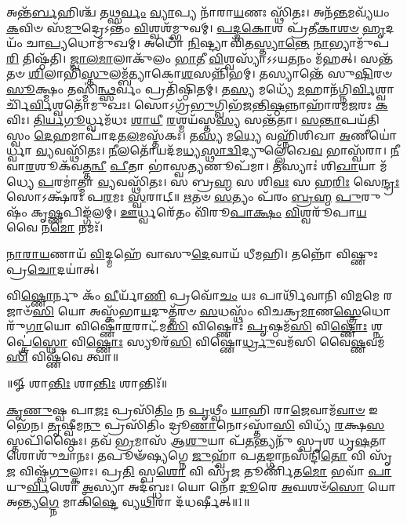 𑌅𑌨𑍍𑌤᳴\-\ul{𑌰𑍍𑌬}\-𑌹𑌿𑌶𑍍𑌚᳴ 𑌤\-\ul{𑌥𑍍𑌸}\-\-\ul{𑌰𑍍𑌵𑌂} \ul{𑌵𑍍𑌯𑌾}\-𑌪𑍍𑌯 𑌨𑌾᳴𑌰𑌾\-\ul{𑌯}\-𑌣𑌃 𑌸𑍍𑌥𑌿᳴𑌤𑌃। 𑌅𑌨᳴\-\ul{𑌨𑍍𑌤}\-𑌮𑌵𑍍𑌯᳴𑌯𑌂 \ul{𑌕}\-𑌵𑌿𑍞 𑌸᳴\-\ul{𑌮𑍁}\-𑌦𑍍𑌰𑍇𑌽𑌨𑍍𑌤𑌂᳴  \ul{𑌵𑌿}\-𑌶𑍍𑌵𑌶᳴𑌮𑍍𑌭𑍁𑌵𑌮𑍍। \ul{𑌪}\-\-\ul{𑌦𑍍𑌮}\-\-\ul{𑌕𑍋}\-𑌶 𑌪𑍍𑌰᳴𑌤𑍀\-\ul{𑌕𑌾}\-\-\ul{𑌶}\-\-\ul{𑍞} \ul{𑌹𑍃}\-𑌦𑌯𑌂᳴ 𑌚𑌾\-\ul{𑌪𑍍𑌯}\-𑌧𑍋𑌮𑍁᳴𑌖𑌮𑍍। 𑌅𑌧𑍋᳴ \ul{𑌨𑌿}\-𑌷𑍍𑌟𑍍𑌯𑌾 𑌵𑌿᳴𑌤\-\ul{𑌸𑍍𑌤𑍍𑌯𑌾}\-\-\ul{𑌨𑍍𑌤𑍇} \ul{𑌨𑌾}\-𑌭𑍍𑌯𑌾𑌮𑍁᳴𑌪\-\ul{𑌰𑌿} 𑌤𑌿𑌷𑍍𑌠᳴𑌤𑌿। \ul{𑌜𑍍𑌵𑌾}\-\-\ul{𑌲}\-\-\ul{𑌮𑌾}\-𑌲𑌾𑌕𑍁᳴𑌲𑌂 \ul{𑌭𑌾}\-\-\ul{𑌤𑍀} \ul{𑌵𑌿}\-𑌶𑍍𑌵𑌸𑍍𑌯𑌾᳴𑌽𑌽𑌯\-\ul{𑌤}\-𑌨𑌂 𑌮᳴𑌹𑌤𑍍। 𑌸𑌨𑍍𑌤᳴𑌤𑍞 \ul{𑌶𑌿}\-𑌲𑌾𑌭𑌿᳴\-\ul{𑌸𑍍𑌤𑍁}\-\-𑌲𑌮𑍍𑌬᳴𑌤𑍍𑌯𑌾𑌕𑍋\-\ul{𑌶}\-𑌸𑌨𑍍𑌨𑌿᳴𑌭𑌮𑍍। 𑌤𑌸𑍍𑌯𑌾𑌨𑍍𑌤𑍇᳴ 𑌸𑍁\-\ul{𑌷𑌿}\-𑌰𑍞 \ul{𑌸𑍂}\-𑌕𑍍𑌷𑍍𑌮𑌂 𑌤𑌸𑍍𑌮𑌿॑\-\ul{𑌨𑍍𑌥𑍍𑌸}\-𑌰𑍍𑌵𑌂 𑌪𑍍𑌰𑌤𑌿᳴𑌷𑍍𑌠𑌿𑌤𑌮𑍍। 𑌤\-\ul{𑌸𑍍𑌯} 𑌮𑌧𑍍𑌯𑍇᳴ \ul{𑌮}\-𑌹𑌾𑌨᳴\-𑌗𑍍𑌨𑌿\-\ul{𑌰𑍍𑌵𑌿}\-𑌶𑍍𑌵𑌾𑌰𑍍𑌚𑌿᳴\-\ul{𑌰𑍍𑌵𑌿}\-𑌶𑍍𑌵𑌤𑍋᳴𑌮𑍁𑌖𑌃। 𑌸𑍋𑌽𑌗𑍍𑌰᳴\-\ul{𑌭𑍁}\-𑌗𑍍𑌵𑌿𑌭᳴𑌜\-\ul{𑌨𑍍𑌤𑌿}\-\-\ul{𑌷𑍍𑌠}\-𑌨𑍍𑌨𑌾𑌹𑌾᳴𑌰𑌮\-\ul{𑌜}\-𑌰𑌃 \ul{𑌕}\-𑌵𑌿𑌃। \ul{𑌤𑌿}\-\-\ul{𑌰𑍍𑌯}\-\-\ul{𑌗𑍂}\-𑌰𑍍𑌧𑍍𑌵𑌮᳴𑌧𑌃 \ul{𑌶𑌾}\-\-\ul{𑌯𑍀} \ul{𑌰}\-𑌶𑍍𑌮𑌯᳴𑌸𑍍𑌤\-\ul{𑌸𑍍𑌯} 𑌸𑌨𑍍𑌤᳴𑌤𑌾। \ul{𑌸}\-\-\ul{𑌨𑍍𑌤𑌾}\-𑌪𑌯᳴𑌤𑌿 𑌸𑍍𑌵𑌂 \ul{𑌦𑍇}\-𑌹𑌮𑌾𑌪𑌾᳴𑌦𑌤\-\ul{𑌲}\-𑌮𑌸𑍍𑌤᳴𑌕𑌃। 𑌤\-\ul{𑌸𑍍𑌯} 𑌮\-\ul{𑌧𑍍𑌯𑍇} 𑌵𑌹𑍍𑌨𑌿᳴𑌶𑌿𑌖𑌾 \ul{𑌅}\-𑌣𑍀𑌯𑍋॑𑌰𑍍𑌧𑍍𑌵𑌾 \ul{𑌵𑍍𑌯}\-𑌵𑌸𑍍𑌥𑌿᳴𑌤𑌃। \ul{𑌨𑍀}\-𑌲𑌤𑍋᳴𑌯𑌦᳴\-𑌮\-\ul{𑌧𑍍𑌯}\-\-\ul{𑌸𑍍𑌥𑌾}\-\-\ul{𑌦𑍍𑌵𑌿}\-𑌦𑍍𑌯𑍁𑌲𑍍𑌲𑍇᳴𑌖𑍇\-\ul{𑌵}  𑌭𑌾𑌸𑍍𑌵᳴𑌰𑌾। \ul{𑌨𑍀}\-𑌵𑌾\-\ul{𑌰}\-𑌶𑍂𑌕᳴𑌵\-\ul{𑌤𑍍𑌤}\-\-\ul{𑌨𑍍𑌵𑍀} \ul{𑌪𑍀}\-𑌤𑌾 𑌭𑌾॑𑌸𑍍𑌵\-\ul{𑌤𑍍𑌯}\-𑌣𑍂𑌪᳴𑌮𑌾। 𑌤𑌸𑍍𑌯𑌾𑌃॑ 𑌶𑌿\-\ul{𑌖𑌾}\-𑌯𑌾 𑌮᳴𑌧𑍍𑌯𑍇 \ul{𑌪}\-𑌰𑌮𑌾॑𑌤𑍍𑌮𑌾 \ul{𑌵𑍍𑌯}\-𑌵𑌸𑍍𑌥𑌿᳴𑌤𑌃। 𑌸 𑌬𑍍𑌰\-\ul{𑌹𑍍𑌮} 𑌸 𑌶𑌿\-\ul{𑌵𑌃} 𑌸 𑌹\-\ul{𑌰𑌿𑌃} 𑌸𑍇\-\ul{𑌨𑍍𑌦𑍍𑌰𑌃} 𑌸𑍋𑌽𑌕𑍍𑌷᳴𑌰𑌃 𑌪\-\ul{𑌰}\-𑌮𑌃 \ul{𑌸𑍍𑌵}\-𑌰𑌾𑌟𑍍॥ 
\-\ul{𑌋}\-𑌤𑍞 \ul{𑌸}\-𑌤𑍍𑌯𑌂 𑌪᳴𑌰𑌂 \ul{𑌬𑍍𑌰}\-\-\ul{𑌹𑍍𑌮} \ul{𑌪𑍁}\-𑌰𑍁𑌷𑌂᳴ 𑌕𑍃\-\ul{𑌷𑍍𑌣}\-𑌪𑌿𑌙𑍍𑌗᳴𑌲𑌮𑍍। \ul{𑌊}\-𑌰𑍍𑌧𑍍𑌵𑌰𑍇᳴𑌤𑌂 𑌵𑌿᳴𑌰𑍂\-\ul{𑌪𑌾}\-\-\ul{𑌕𑍍𑌷𑌂} \ul{𑌵𑌿}\-𑌶𑍍𑌵𑌰𑍂᳴𑌪𑌾\-\ul{𑌯} 𑌵𑍈 𑌨\-\ul{𑌮𑍋} 𑌨𑌮𑌃᳴। 

\-\ul{𑌨𑌾}\-\-\ul{𑌰𑌾}\-\-\ul{𑌯}\-𑌣𑌾𑌯᳴ \ul{𑌵𑌿}\-𑌦𑍍𑌮𑌹𑍇᳴ 𑌵𑌾𑌸𑍁\-\ul{𑌦𑍇}\-𑌵𑌾𑌯᳴ 𑌧𑍀𑌮𑌹𑌿। 𑌤𑌨𑍍𑌨𑍋᳴ 𑌵𑌿𑌷𑍍𑌣𑍁𑌃 𑌪𑍍𑌰\-\ul{𑌚𑍋}\-𑌦𑌯𑌾॑𑌤𑍍। 

𑌵𑌿\-\ul{𑌷𑍍𑌣𑍋}\-𑌰𑍍𑌨𑍁 𑌕𑌂᳴ \ul{𑌵𑍀}\-𑌰𑍍𑌯𑌾᳴\-\ul{𑌣𑌿} 𑌪𑍍𑌰𑌵𑍋᳴\-\ul{𑌚𑌂} 𑌯𑌃 𑌪𑌾𑌰𑍍𑌥𑌿᳴𑌵𑌾𑌨𑌿 𑌵𑌿\-\ul{𑌮}\-𑌮𑍇 𑌰𑌜𑌾𑍞᳴\-\ul{𑌸𑌿} 𑌯𑍋 𑌅𑌸𑍍𑌕᳴𑌭𑌾\-\ul{𑌯}\-𑌦𑍁𑌤𑍍𑌤᳴𑌰𑍞 \ul{𑌸}\-𑌧𑌸𑍍𑌥𑌂᳴ 𑌵𑌿𑌚𑌕𑍍𑌰\-\ul{𑌮𑌾}\-𑌣\-\ul{𑌸𑍍𑌤𑍍𑌰𑍇}\-𑌧𑍋𑌰𑍁᳴\-\ul{𑌗𑌾}\-𑌯𑍋 𑌵𑌿𑌷𑍍𑌣𑍋᳴\-\ul{𑌰}\-𑌰𑌾𑌟᳴𑌮\-\ul{𑌸𑌿} 𑌵𑌿𑌷𑍍𑌣𑍋𑌃॑ \ul{𑌪𑍃}\-𑌷𑍍𑌠𑌮᳴\-\ul{𑌸𑌿} 𑌵𑌿\-\ul{𑌷𑍍𑌣𑍋𑌃} 𑌶𑍍𑌨𑌪𑍍𑌤𑍍𑌰𑍇॑\-\ul{𑌸𑍍𑌥𑍋} 𑌵𑌿\-\ul{𑌷𑍍𑌣𑍋𑌃} 𑌸𑍍𑌯𑍂𑌰᳴\-\ul{𑌸𑌿} 𑌵𑌿𑌷𑍍𑌣𑍋॑\-\ul{𑌰𑍍𑌧𑍍𑌰𑍁}\-𑌵𑌮᳴𑌸𑌿 𑌵𑍈\-\ul{𑌷𑍍𑌣}\-𑌵𑌮᳴\-\ul{𑌸𑌿} 𑌵𑌿𑌷𑍍𑌣᳴𑌵𑍇 𑌤𑍍𑌵𑌾॥ 

\centerline{॥𑍐 𑌶𑌾\-\ul{𑌨𑍍𑌤𑌿𑌃} 𑌶𑌾\-\ul{𑌨𑍍𑌤𑌿𑌃} 𑌶𑌾𑌨𑍍𑌤𑌿𑌃᳴॥}

\-\ul{𑌕𑍃}\-\-\ul{𑌣𑍁}\-𑌷𑍍𑌵 𑌪𑌾\-\ul{𑌜𑌃} 𑌪𑍍𑌰𑌸𑌿᳴\-\ul{𑌤𑌿𑌂} 𑌨 \ul{𑌪𑍃}\-𑌥𑍍𑌵𑍀𑌂 \ul{𑌯𑌾}\-𑌹𑌿 𑌰𑌾\-\ul{𑌜𑍇}\-𑌵𑌾𑌮᳴\-\ul{𑌵𑌾}\-\-\ul{𑍞} 𑌇𑌭𑍇᳴𑌨। \ul{𑌤𑍃}\-𑌷𑍍𑌵𑍀𑌮\-\ul{𑌨𑍁} 𑌪𑍍𑌰𑌸𑌿᳴𑌤𑌿𑌂 𑌦𑍍𑌰𑍂\-\ul{𑌣𑌾}\-𑌨𑍋𑌽𑌸𑍍𑌤𑌾᳴\-\ul{𑌸𑌿} 𑌵𑌿𑌧𑍍𑌯᳴ \ul{𑌰}\-𑌕𑍍𑌷\-\ul{𑌸}\-𑌸𑍍𑌤𑌪𑌿᳴𑌷𑍍𑌠𑍈𑌃। 𑌤𑌵᳴ \ul{𑌭𑍍𑌰}\-𑌮𑌾𑌸᳴ 𑌆\-\ul{𑌶𑍁}\-𑌯𑌾 𑌪᳴\-\ul{𑌤}\-𑌨𑍍𑌤𑍍𑌯𑌨𑍁᳴ 𑌸𑍍𑌪𑍃𑌶 𑌧𑍃\-\ul{𑌷}\-𑌤𑌾 𑌶𑍋𑌶𑍁᳴𑌚𑌾𑌨𑌃। 𑌤𑌪𑍂𑍟᳴𑌷𑍍𑌯𑌗𑍍𑌨𑍇 \ul{𑌜𑍁}\-𑌹𑍍𑌵𑌾᳴ 𑌪\-\ul{𑌤}\-𑌙𑍍𑌗𑌾𑌨𑌸᳴𑌨𑍍𑌦𑌿\-\ul{𑌤𑍋} 𑌵𑌿 𑌸𑍃᳴\-\ul{𑌜} 𑌵𑌿𑌷𑍍𑌵᳴\-\ul{𑌗𑍁}\-𑌲𑍍𑌕𑌾𑌃। 𑌪𑍍𑌰\-\ul{𑌤𑌿} 𑌸𑍍𑌪\-\ul{𑌶𑍋} 𑌵𑌿 𑌸𑍃᳴\-\ul{𑌜} 𑌤𑍂𑌰𑍍𑌣𑌿᳴𑌤\-\ul{𑌮𑍋} 𑌭𑌵𑌾᳴ \ul{𑌪𑌾}\-𑌯𑍁\-\ul{𑌰𑍍𑌵𑌿}\-𑌶𑍋 \ul{𑌅}\-𑌸𑍍𑌯𑌾 𑌅𑌦᳴𑌬𑍍𑌧𑌃। 𑌯𑍋 𑌨𑍋᳴ \ul{𑌦𑍂}\-𑌰𑍇 \ul{𑌅}\-𑌘𑌶𑍞᳴\-\ul{𑌸𑍋}  𑌯𑍋 𑌅𑌨𑍍𑌤𑍍𑌯\-\ul{𑌗𑍍𑌨𑍇} 𑌮𑌾𑌕𑌿᳴\-\ul{𑌷𑍍𑌟𑍇} 𑌵𑍍𑌯\-\ul{𑌥𑌿}\-𑌰𑌾 𑌦᳴𑌧𑌰𑍍𑌷𑍀𑌤𑍍॥1॥

